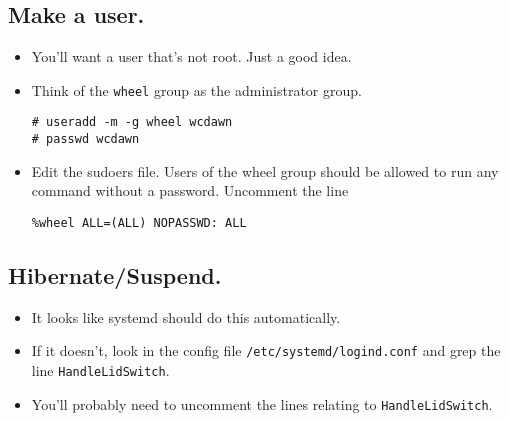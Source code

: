\documentclass{article}
\begin{document}
  \subsection{Make a user.}
    \begin{itemize}
      \item You'll want a user that's not root. Just a good idea.
      \item Think of the \verb|wheel| group as the administrator group.
\begin{verbatim}
# useradd -m -g wheel wcdawn
# passwd wcdawn
\end{verbatim}
      \item Edit the sudoers file. Users of the wheel group should be allowed to
        run any command without a password. Uncomment the line
\begin{verbatim}
%wheel ALL=(ALL) NOPASSWD: ALL
\end{verbatim}
    \end{itemize}

  \subsection{Hibernate/Suspend.}
    \begin{itemize}
      \item It looks like systemd should do this automatically.
      \item If it doesn't, look in the config file
        \verb|/etc/systemd/logind.conf| and grep the line
        \verb|HandleLidSwitch|.
      \item You'll probably need to uncomment the lines relating to
        \verb|HandleLidSwitch|.
    \end{itemize}
\end{document}
